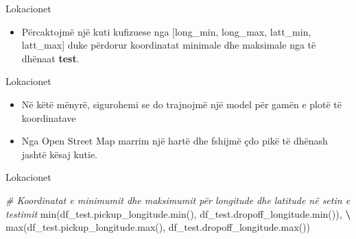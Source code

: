 \documentclass[
  ignorenonframetext,
]{beamer}
\newenvironment{Shaded}{\begin{snugshade}}{\end{snugshade}}
\newcommand{\BuiltInTok}[1]{#1}
\newcommand{\CommentTok}[1]{\textcolor[rgb]{0.56,0.35,0.01}{\textit{#1}}}
\newcommand{\NormalTok}[1]{#1}
\newcommand{\OperatorTok}[1]{\textcolor[rgb]{0.81,0.36,0.00}{\textbf{#1}}}
\providecommand{\tightlist}{%
  \setlength{\itemsep}{0pt}\setlength{\parskip}{0pt}}
\begin{document}
\begin{frame}{Lokacionet}
\protect\hypertarget{lokacionet-2}{}
\begin{itemize}
\tightlist
\item
  Përcaktojmë një kuti kufizuese nga {[}long\_min, long\_max, latt\_min,
  latt\_max{]} duke përdorur koordinatat minimale dhe maksimale nga të
  dhënaat \textbf{test}.
\end{itemize}
\end{frame}

\begin{frame}{Lokacionet}
\protect\hypertarget{lokacionet-3}{}
\begin{itemize}
\item
  Në këtë mënyrë, sigurohemi se do trajnojmë një model për gamën e plotë
  të koordinatave
\item
  Nga Open Street Map marrim një hartë dhe fshijmë çdo pikë të dhënash
  jashtë kësaj kutie.
\end{itemize}
\end{frame}

\begin{frame}[fragile]{Lokacionet}
\protect\hypertarget{lokacionet-4}{}

\begin{Shaded}
\begin{Highlighting}[]
\CommentTok{\# Koordinatat e minimumit dhe maksimumit për longitude dhe latitude në setin e testimit}
\BuiltInTok{min}\NormalTok{(df\_test.pickup\_longitude.}\BuiltInTok{min}\NormalTok{(), df\_test.dropoff\_longitude.}\BuiltInTok{min}\NormalTok{()), }\OperatorTok{\textbackslash{}}
\BuiltInTok{max}\NormalTok{(df\_test.pickup\_longitude.}\BuiltInTok{max}\NormalTok{(), df\_test.dropoff\_longitude.}\BuiltInTok{max}\NormalTok{())}
\end{Highlighting}
\end{Shaded}
\end{frame}
\end{document}
